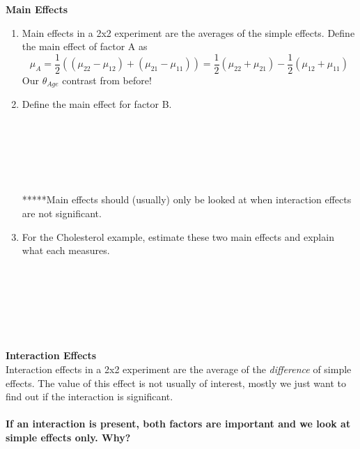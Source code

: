 \newpage

\textbf{Main Effects}
\begin{enumerate}
\item Main effects in a 2x2 experiment are the averages of the simple effects.  Define the main effect of factor A as
$$\mu_{A}=\frac{1}{2}\left((\mu_{22}-\mu_{12})+(\mu_{21}-\mu_{11})\right)=\frac{1}{2}(\mu_{22}+\mu_{21})-\frac{1}{2}(\mu_{12}+\mu_{11})$$
Our $\theta_{Age}$ contrast from before!
\item Define the main effect for factor B.\\~\\~\\~\\~\\~\\~\\
*****Main effects should (usually) only be looked at when interaction effects are not significant.\\
\item For the Cholesterol example, estimate these two main effects and explain what each measures.\\~\\~\\~\\~\\~\\~\\
\end{enumerate}

\textbf{Interaction Effects}\\
Interaction effects in a 2x2 experiment are the average of the \textit{difference} of simple effects.  The value of this effect is not usually of interest, mostly we just want to find out if the interaction is significant.\\~\\

\textbf{If an interaction is present, both factors are important and we look at simple effects only.  Why?}

\newpage

